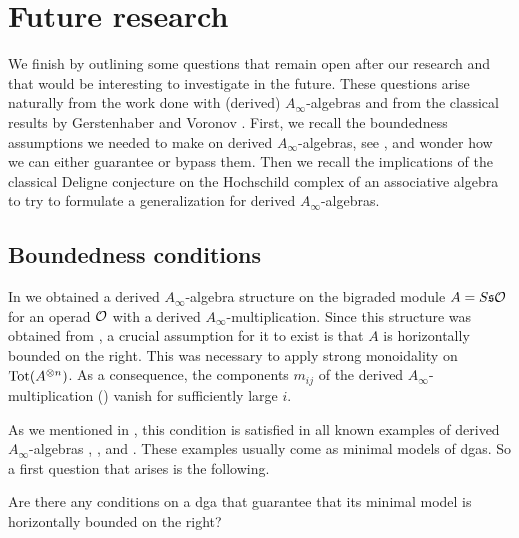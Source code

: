 \documentclass[Thesis.tex]{subfiles}
\begin{document}

\chapter{Future research}\label{future}

We finish by outlining some questions that remain open after our research and that would be interesting to investigate in the future. These questions arise naturally from the work done with (derived) $A_\infty$-algebras and from the classical results by Gerstenhaber and Voronov \cite{GV}. First, we recall the boundedness assumptions we needed to make on derived $A_\infty$-algebras, see , and wonder how we can either guarantee or bypass them. Then we recall the implications of the classical Deligne conjecture on the Hochschild complex of an associative algebra to try to formulate a generalization for derived $A_\infty$-algebras.

\section{Boundedness conditions}

In  we obtained a derived $A_\infty$-algebra structure on the bigraded module $A=S\mathfrak{s}{\mathcal O}$ for an operad ${\mathcal O}$ with a derived $A_\infty$-multiplication. Since this structure was obtained from , a crucial assumption for it to exist is that $A$ is horizontally bounded on the right. This was necessary to apply strong monoidality on $\operatorname{Tot}(A^{\otimes n})$. As a consequence, the components $m_{ij}$ of the derived $A_\infty$-multiplication () vanish for sufficiently large $i$. 

As we mentioned in , this condition is satisfied in all known examples of derived $A_\infty$-algebras \cite[Remark 6.5]{muro}, \cite{RW}, and \cite[\S 5]{women}. These examples usually come as minimal models of dgas. So a first question that arises is the following.

\begin{question}{2}
Are there any conditions on a dga that guarantee that its minimal model is horizontally bounded on the right?
\end{question}
\end{document}
